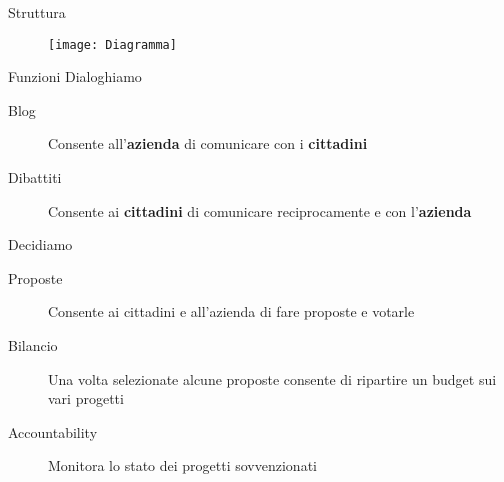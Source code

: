 \begin{frame}{Struttura}

  \begin{figure}

    \texttt{[image: Diagramma]}
  \end{figure}

\end{frame}
\begin{frame}{Funzioni}
  \alert{Dialoghiamo}

  \begin{description}
    \item[Blog] Consente all'\textbf{azienda} di comunicare con i \textbf{cittadini}
    \item[Dibattiti] Consente ai \textbf{cittadini} di comunicare reciprocamente e con l'\textbf{azienda}
  \end{description}

  \alert{Decidiamo}

  \begin{description}
    \item[Proposte] Consente ai cittadini e all'azienda di fare proposte e votarle
    \item[Bilancio] Una volta selezionate alcune proposte consente di ripartire un budget sui vari progetti
    \item[Accountability] Monitora lo stato dei progetti sovvenzionati
  \end{description}

\end{frame}